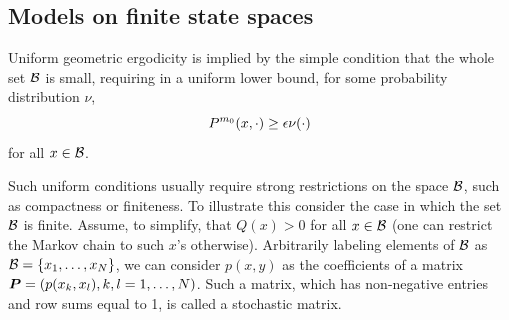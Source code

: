 %
%
%
%

\subsection{Models on finite state spaces}

Uniform geometric ergodicity is implied by the simple condition that the whole set ${\mathcal B}$ is small, requiring in a uniform lower bound, for some probability distribution $\nu$,
\begin{equation}
\label{eq:ergodic.unif}
P^{m_0}(x, \cdot) \geq \epsilon \nu(\cdot)
\end{equation}
for all $x\in {\mathcal B}$.

Such uniform conditions usually require strong restrictions on the space ${\mathcal B}$, such as compactness or finiteness. 
To illustrate this consider the case in which the set ${\mathcal B}$ is finite. Assume, to simplify,  that $Q(x)>0$ for all $x\in {\mathcal B}$ (one can restrict the Markov chain to such $x$'s otherwise).
 Arbitrarily labeling elements of ${\mathcal B}$ as ${\mathcal B} = \{x_1, \ldots, x_N\}$, we can consider $p(x,y)$ as the coefficients of a matrix
${\bm{P}} = (p(x_k, x_l), k,l=1, \ldots, N)$. Such a matrix, which has
non-negative entries and  row sums equal to 1, is called a stochastic
matrix.

